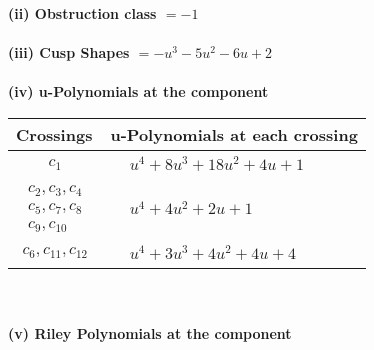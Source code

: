 \documentclass[1p]{elsarticle_modified}
\theoremstyle{definition}
\begin{document}
\flushleft \textbf{(ii) Obstruction class $= -1$}\\~\\
\flushleft \textbf{(iii) Cusp Shapes $= - u^3-5 u^2-6 u+2$}\\~\\
\newpage\renewcommand{\arraystretch}{1}
\flushleft \textbf{(iv) u-Polynomials at the component}\newline \\
\begin{tabular}{m{50pt}|m{274pt}}
Crossings & \hspace{64pt}u-Polynomials at each crossing \\
\hline $$\begin{aligned}c_{1}\end{aligned}$$&$\begin{aligned}
&u^4+8 u^3+18 u^2+4 u+1
\end{aligned}$\\
\hline $$\begin{aligned}c_{2},c_{3},c_{4}\\c_{5},c_{7},c_{8}\\c_{9},c_{10}\end{aligned}$$&$\begin{aligned}
&u^4+4 u^2+2 u+1
\end{aligned}$\\
\hline $$\begin{aligned}c_{6},c_{11},c_{12}\end{aligned}$$&$\begin{aligned}
&u^4+3 u^3+4 u^2+4 u+4
\end{aligned}$\\
\hline
\end{tabular}\\~\\
\newpage\renewcommand{\arraystretch}{1}
\flushleft \textbf{(v) Riley Polynomials at the component}\newline \\
\end{document}
